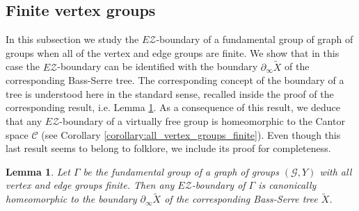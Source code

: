 \documentclass[12pt, a4paper]{article}
\newcommand{\8}{\infty}
\theoremstyle{break}
\newtheorem{lm}[thm]{Lemma}
\theoremstyle{defbreak}
\newcommand{\wtl}[1]{\widetilde{#1}}
\begin{document}
\subsection{Finite vertex groups}\label{Subsection:boundary_of_virt_free_groups}

In this subsection we study the $E\mathcal{Z}$-boundary of a fundamental group of graph of groups when all of the vertex and edge groups are finite. 
We show that in this case the $E\mathcal{Z}$-boundary
can be identified with the boundary $\partial_\infty\wtl{X}$
of the corresponding Bass-Serre tree.
The corresponding concept of the boundary of a tree
is understood here in the standard sense, recalled inside the proof of the corresponding result, i.e. Lemma \ref{lemma:virtually_free_case}. 
As a consequence of this result, we deduce that any $E\mathcal{Z}$-boundary of a virtually free group is homeomorphic to the Cantor space $\mathcal{C}$ (see Corollary \ref{corollary:all_vertex_groups_finite}).
Even though this last result seems to belong to folklore, we include its proof for completeness. 

\medskip

\begin{lm}\label{lemma:virtually_free_case}
    Let $\Gamma$ be the fundamental group of a graph of groups $(\mathcal{G},Y)$ with all vertex and edge groups finite. Then any $E\mathcal{Z}$-boundary of $\Gamma$ is canonically homeomorphic to the boundary $\partial_\infty\wtl{X}$ of the corresponding Bass-Serre tree $\wtl{X}$.
\end{lm}
\end{document}
